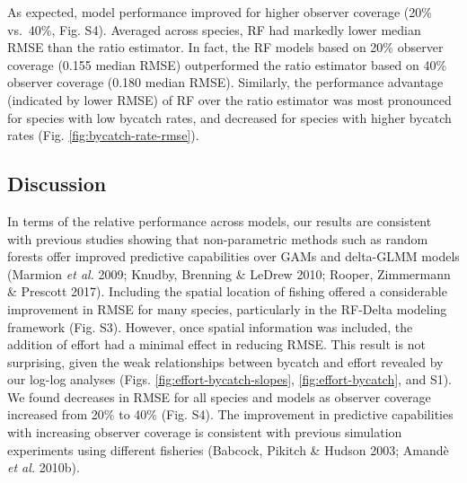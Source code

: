 \documentclass[]{article}
\begin{document}
As expected, model performance improved for higher observer coverage
(20\% vs.~40\%, Fig. S4). Averaged across species, RF had markedly lower
median RMSE than the ratio estimator. In fact, the RF models based on
20\% observer coverage (0.155 median RMSE) outperformed the ratio
estimator based on 40\% observer coverage (0.180 median RMSE).
Similarly, the performance advantage (indicated by lower RMSE) of RF
over the ratio estimator was most pronounced for species with low
bycatch rates, and decreased for species with higher bycatch rates (Fig.
\ref{fig:bycatch-rate-rmse}).

\hypertarget{discussion}{%
\subsection{Discussion}\label{discussion}}

In terms of the relative performance across models, our results are
consistent with previous studies showing that non-parametric methods
such as random forests offer improved predictive capabilities over GAMs
and delta-GLMM models (Marmion \emph{et al.} 2009; Knudby, Brenning \&
LeDrew 2010; Rooper, Zimmermann \& Prescott 2017). Including the spatial
location of fishing offered a considerable improvement in RMSE for many
species, particularly in the RF-Delta modeling framework (Fig. S3).
However, once spatial information was included, the addition of effort
had a minimal effect in reducing RMSE. This result is not surprising,
given the weak relationships between bycatch and effort revealed by our
log-log analyses (Figs. \ref{fig:effort-bycatch-slopes},
\ref{fig:effort-bycatch}, and S1). We found decreases in RMSE for all
species and models as observer coverage increased from 20\% to 40\%
(Fig. S4). The improvement in predictive capabilities with increasing
observer coverage is consistent with previous simulation experiments
using different fisheries (Babcock, Pikitch \& Hudson 2003; Amandè
\emph{et al.} 2010b).
\end{document}
